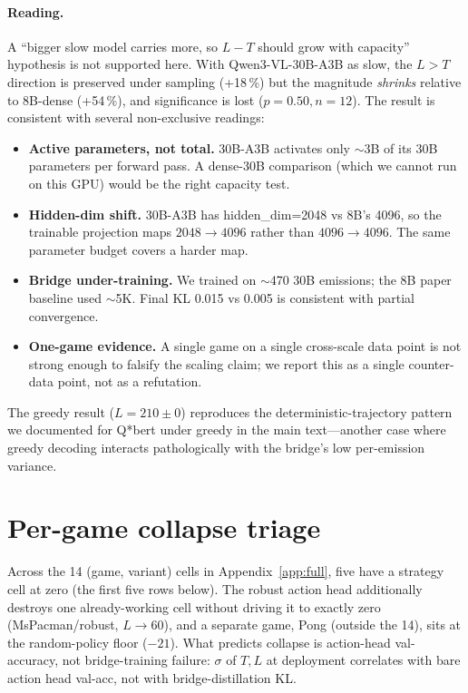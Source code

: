 \documentclass[11pt]{article}
\begin{document}
\paragraph{Reading.}
A ``bigger slow model carries more, so $L\!-\!T$ should grow with capacity'' hypothesis is not supported here. With Qwen3-VL-30B-A3B as slow, the $L\!>\!T$ direction is preserved under sampling (+18\,\%) but the magnitude \emph{shrinks} relative to 8B-dense (+54\,\%), and significance is lost ($p\!=\!0.50, n\!=\!12$). The result is consistent with several non-exclusive readings:
\begin{itemize}[topsep=0pt,itemsep=0pt,leftmargin=*]
\item \textbf{Active parameters, not total.} 30B-A3B activates only $\sim$3B of its 30B parameters per forward pass. A dense-30B comparison (which we cannot run on this GPU) would be the right capacity test.
\item \textbf{Hidden-dim shift.} 30B-A3B has hidden\_dim=2048 vs 8B's 4096, so the trainable projection maps $2048\to4096$ rather than $4096\to4096$. The same parameter budget covers a harder map.
\item \textbf{Bridge under-training.} We trained on $\sim$470 30B emissions; the 8B paper baseline used $\sim$5K. Final KL 0.015 vs 0.005 is consistent with partial convergence.
\item \textbf{One-game evidence.} A single game on a single cross-scale data point is not strong enough to falsify the scaling claim; we report this as a single counter-data point, not as a refutation.
\end{itemize}

The greedy result ($L=210\pm0$) reproduces the deterministic-trajectory pattern we documented for Q*bert under greedy in the main text---another case where greedy decoding interacts pathologically with the bridge's low per-emission variance.

\section{Per-game collapse triage}
\label{app:collapse}

Across the 14 (game, variant) cells in Appendix~\ref{app:full}, five have a strategy cell at zero (the first five rows below). The robust action head additionally destroys one already-working cell without driving it to exactly zero (MsPacman/robust, $L\!\to\!60$), and a separate game, Pong (outside the 14), sits at the random-policy floor ($-21$). What predicts collapse is action-head val-accuracy, not bridge-training failure: $\sigma$ of $T,L$ at deployment correlates with bare action head val-acc, not with bridge-distillation KL.
\end{document}
